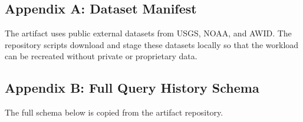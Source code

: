 \subsection{Appendix A: Dataset
Manifest}\label{appendix-a-dataset-manifest}

The artifact uses public external datasets from USGS, NOAA, and AWID.
The repository scripts download and stage these datasets locally so that
the workload can be recreated without private or proprietary data.

\subsection{Appendix B: Full Query History
Schema}\label{appendix-b-full-query-history-schema}

The full schema below is copied from the artifact repository.

